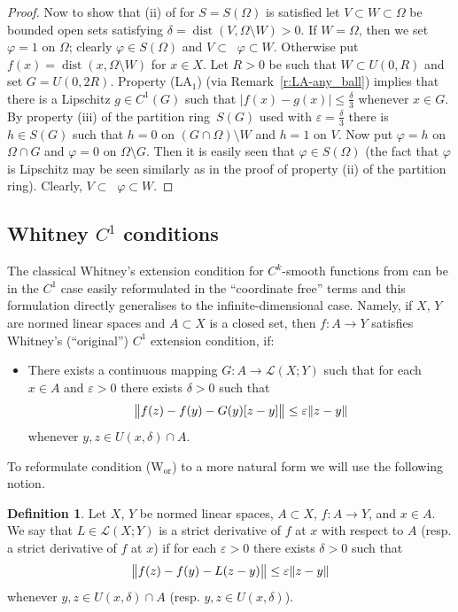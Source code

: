 \documentclass[a4paper,twoside,10pt,reqno,draft]{amsart}
\theoremstyle{definition}
\newtheorem{definition}[theorem]{Definition}
\theoremstyle{remark}
\newcommand\abs[1]{\mathopen|#1\mathclose|}
\newcommand\norm[1]{\mathopen\|#1\mathclose\|}
\newcommand\normb[2]{\csname#1l\endcsname\|#2\csname#1r\endcsname\|}
\newcommand\de{\delta}
\newcommand\ve{\varepsilon}
\newcommand\vp{\varphi}
\newcommand\Om{\Omega}
\DeclareMathOperator{\suppo}{supp_o}
\DeclareMathOperator{\dist}{dist}
\newcommand\lin[2]{\mathcal L(#1;#2)}
\newcommand\pLA[1]{(LA$_#1$)}
\newcommand\cWor{(W$_{\mathrm{or}}$)}
\begin{document}
\begin{proof}
Now to show that (ii) of \cite[Lemma~7.49]{HJ} for $S=S(\Om)$ is satisfied let $V\subset W\subset\Om$ be bounded open sets satisfying $\de=\dist(V,\Om\setminus W)>0$.
If $W=\Om$, then we set $\vp=1$ on $\Om$; clearly $\vp\in S(\Om)$ and $V\subset\suppo\vp\subset W$.
Otherwise put $f(x)=\dist(x,\Om\setminus W)$ for $x\in X$.
Let $R>0$ be such that $W\subset U(0,R)$ and set $G=U(0,2R)$.
Property \pLA1 (via Remark~\ref{r:LA-any_ball}) implies that there is a Lipschitz $g\in C^1(G)$ such that $\abs{f(x)-g(x)}\le\frac\de3$ whenever $x\in G$.
By property (iii) of the partition ring~$S(G)$ used with $\ve=\frac\de3$ there is $h\in S(G)$ such that $h=0$ on $(G\cap\Om)\setminus W$ and $h=1$ on $V$.
Now put $\vp=h$ on $\Om\cap G$ and $\vp=0$ on $\Om\setminus G$.
Then it is easily seen that $\vp\in S(\Om)$
(the fact that $\vp$ is Lipschitz may be seen similarly as in the proof of property (ii) of the partition ring).
Clearly, $V\subset\suppo\vp\subset W$.
\end{proof}

\subsection{\texorpdfstring{Whitney $C^1$ conditions}{Whitney C1 conditions}}\label{ss:Whitney_cond}

The classical Whitney's extension condition for $C^k$-smooth functions from \cite{Wh1} can be in the $C^1$ case easily reformulated in the ``coordinate free'' terms
and this formulation directly generalises to the infinite-dimensional case.
Namely, if $X$, $Y$ are normed linear spaces and $A\subset X$ is a closed set, then $f\colon A\to Y$ satisfies Whitney's (``original'') $C^1$ extension condition, if:
\begin{itemize}
\item[\cWor\ ]
There exists a continuous mapping $G\colon A\to\lin XY$ such that for each $x\in A$ and $\ve>0$ there exists $\de>0$ such that
\[
\normb{big}{f(z)-f(y)-G(y)[z-y]}\le\ve\norm{z-y}
\]
whenever $y,z\in U(x,\de)\cap A$.
\end{itemize}

To reformulate condition {\cWor} to a more natural form we will use the following notion.
\begin{definition}
Let $X$, $Y$ be normed linear spaces, $A\subset X$, $f\colon A\to Y$, and $x\in A$.
We say that $L\in\lin XY$ is a strict derivative of $f$ at $x$ with respect to $A$ (resp. a strict derivative of $f$ at $x$) if for each $\ve>0$ there exists $\de>0$ such that
\[
\normb{big}{f(z)-f(y)-L(z-y)}\le\ve\norm{z-y}
\]
whenever $y,z\in U(x,\de)\cap A$ (resp. $y,z\in U(x,\de)$).
\end{definition}
\end{document}
